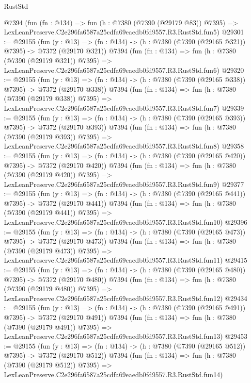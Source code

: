\begin{lexlean}{RustStd}
\begin{coremodule}
    @7394
    (fun (fn : @134) =>
    fun (h : @7380 (@7390 (@29179 @83)) @7395) =>
    LexLeanPreserve.C2e296fa6587a25cdfa69eaedb0fd9557.R3.RustStd.fun5)
@29301 := @29155
    (fun (y : @13) => (fn : @134) -> (h : @7380 (@7390 (@29165 @321)) @7395) -> @7372 (@29170 @321))
    @7394
    (fun (fn : @134) =>
    fun (h : @7380 (@7390 (@29179 @321)) @7395) =>
    LexLeanPreserve.C2e296fa6587a25cdfa69eaedb0fd9557.R3.RustStd.fun6)
@29320 := @29155
    (fun (y : @13) => (fn : @134) -> (h : @7380 (@7390 (@29165 @338)) @7395) -> @7372 (@29170 @338))
    @7394
    (fun (fn : @134) =>
    fun (h : @7380 (@7390 (@29179 @338)) @7395) =>
    LexLeanPreserve.C2e296fa6587a25cdfa69eaedb0fd9557.R3.RustStd.fun7)
@29339 := @29155
    (fun (y : @13) => (fn : @134) -> (h : @7380 (@7390 (@29165 @393)) @7395) -> @7372 (@29170 @393))
    @7394
    (fun (fn : @134) =>
    fun (h : @7380 (@7390 (@29179 @393)) @7395) =>
    LexLeanPreserve.C2e296fa6587a25cdfa69eaedb0fd9557.R3.RustStd.fun8)
@29358 := @29155
    (fun (y : @13) => (fn : @134) -> (h : @7380 (@7390 (@29165 @420)) @7395) -> @7372 (@29170 @420))
    @7394
    (fun (fn : @134) =>
    fun (h : @7380 (@7390 (@29179 @420)) @7395) =>
    LexLeanPreserve.C2e296fa6587a25cdfa69eaedb0fd9557.R3.RustStd.fun9)
@29377 := @29155
    (fun (y : @13) => (fn : @134) -> (h : @7380 (@7390 (@29165 @441)) @7395) -> @7372 (@29170 @441))
    @7394
    (fun (fn : @134) =>
    fun (h : @7380 (@7390 (@29179 @441)) @7395) =>
    LexLeanPreserve.C2e296fa6587a25cdfa69eaedb0fd9557.R3.RustStd.fun10)
@29396 := @29155
    (fun (y : @13) => (fn : @134) -> (h : @7380 (@7390 (@29165 @473)) @7395) -> @7372 (@29170 @473))
    @7394
    (fun (fn : @134) =>
    fun (h : @7380 (@7390 (@29179 @473)) @7395) =>
    LexLeanPreserve.C2e296fa6587a25cdfa69eaedb0fd9557.R3.RustStd.fun11)
@29415 := @29155
    (fun (y : @13) => (fn : @134) -> (h : @7380 (@7390 (@29165 @480)) @7395) -> @7372 (@29170 @480))
    @7394
    (fun (fn : @134) =>
    fun (h : @7380 (@7390 (@29179 @480)) @7395) =>
    LexLeanPreserve.C2e296fa6587a25cdfa69eaedb0fd9557.R3.RustStd.fun12)
@29434 := @29155
    (fun (y : @13) => (fn : @134) -> (h : @7380 (@7390 (@29165 @491)) @7395) -> @7372 (@29170 @491))
    @7394
    (fun (fn : @134) =>
    fun (h : @7380 (@7390 (@29179 @491)) @7395) =>
    LexLeanPreserve.C2e296fa6587a25cdfa69eaedb0fd9557.R3.RustStd.fun13)
@29453 := @29155
    (fun (y : @13) => (fn : @134) -> (h : @7380 (@7390 (@29165 @512)) @7395) -> @7372 (@29170 @512))
    @7394
    (fun (fn : @134) =>
    fun (h : @7380 (@7390 (@29179 @512)) @7395) =>
    LexLeanPreserve.C2e296fa6587a25cdfa69eaedb0fd9557.R3.RustStd.fun14)

\end{coremodule}
\end{lexlean}
